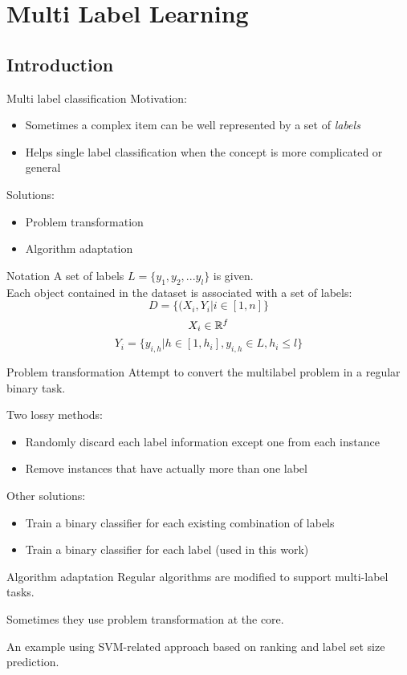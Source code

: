  \section{Multi Label Learning}
 
\subsection{Introduction}
\begin{frame}{Multi label classification}
	Motivation:
	\begin{itemize}\setlength\itemsep{1em}
		\item Sometimes a complex item can be well represented by a set of \textit{labels}
		\item Helps single label classification when the concept is more complicated or general
	\end{itemize}
	Solutions:
	\begin{itemize}\setlength\itemsep{1em}
		\item Problem transformation
		\item Algorithm adaptation
	\end{itemize}
\end{frame}

\begin{frame}{Notation}
	A set of labels $L = \{y_1, y_2,... y_l\}$ is given.\\
	Each object contained in the dataset is associated with a set of labels:
	$$D = \{(X_i, Y_i | i \in [1, n]\}$$
	$$X_i \in \mathbb{R}^f$$
	$$Y_i = \{y_{i,h} | h \in [1, h_i], y_{i,h} \in L, h_i \leq l\}$$
\end{frame}

\begin{frame}{Problem transformation}
	Attempt to convert the multilabel problem in a regular binary task.
	
	Two lossy methods:
	\begin{itemize}\setlength\itemsep{1em}
		\item Randomly discard each label information except one from each instance
		\item Remove instances that have actually more than one label
	\end{itemize}
	Other solutions:
	\begin{itemize}\setlength\itemsep{1em}
		\item Train a binary classifier for each existing combination of labels
		\item Train a binary classifier for each label (used in this work)
	\end{itemize}
\end{frame}

\begin{frame}{Algorithm adaptation}
	Regular algorithms are modified to support multi-label tasks.
	
	Sometimes they use problem transformation at the core.
	
	An example using SVM-related approach based on ranking and label set size prediction.
\end{frame}